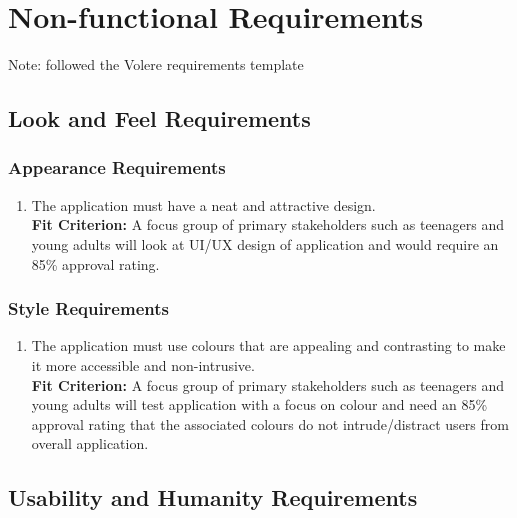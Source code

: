 \documentclass[12pt,letterpaper]{article}
\begin{document}
\section{Non-functional Requirements}
\noindent Note: followed the Volere requirements template

\subsection{Look and Feel Requirements}
\subsubsection{Appearance Requirements}
\begin{enumerate}[{LF}1.] 
\item The application must have a neat and attractive design.\\
{\textbf{Fit Criterion:} A focus group of primary stakeholders such as teenagers and young adults will look at UI/UX design of application and would require an 85\% approval rating.}
\end{enumerate}

\subsubsection{Style Requirements}
\begin{enumerate}[resume*]  
\item The application must use colours that are appealing and contrasting to make it more accessible and non-intrusive.\\
{\textbf{Fit Criterion:} A focus group of primary stakeholders such as teenagers and young adults will test application with a focus on colour and need an 85\% approval rating that the associated colours do not intrude/distract users from overall application.}
\end{enumerate}

\subsection{Usability and Humanity Requirements}
\end{document}
